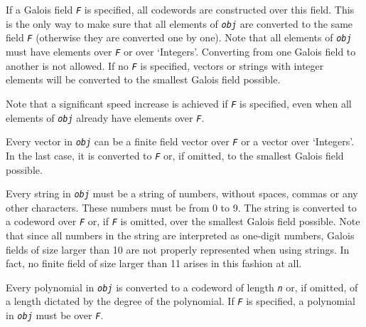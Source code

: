 \documentclass[a4paper,11pt]{report}
\begin{document}
{{{ If a Galois field \mbox{\texttt{\mdseries\slshape F}} is specified, all codewords are constructed over this field. This is the only
way to make sure that all elements of \mbox{\texttt{\mdseries\slshape obj}} are converted to the same field \mbox{\texttt{\mdseries\slshape F}} (otherwise they are converted one by one). Note that all elements of \mbox{\texttt{\mdseries\slshape obj}} must have elements over \mbox{\texttt{\mdseries\slshape F}} or over `Integers'. Converting from one Galois field to another is not
allowed. If no \mbox{\texttt{\mdseries\slshape F}} is specified, vectors or strings with integer elements will be converted to
the smallest Galois field possible. 

 Note that a significant speed increase is achieved if \mbox{\texttt{\mdseries\slshape F}} is specified, even when all elements of \mbox{\texttt{\mdseries\slshape obj}} already have elements over \mbox{\texttt{\mdseries\slshape F}}. 

 Every vector in \mbox{\texttt{\mdseries\slshape obj}} can be a finite field vector over \mbox{\texttt{\mdseries\slshape F}} or a vector over `Integers'. In the last case, it is converted to \mbox{\texttt{\mdseries\slshape F}} or, if omitted, to the smallest Galois field possible. 

 Every string in \mbox{\texttt{\mdseries\slshape obj}} must be a string of numbers, without spaces, commas or any other characters.
These numbers must be from 0 to 9. The string is converted to a codeword over \mbox{\texttt{\mdseries\slshape F}} or, if \mbox{\texttt{\mdseries\slshape F}} is omitted, over the smallest Galois field possible. Note that since all
numbers in the string are interpreted as one-digit numbers, Galois fields of
size larger than 10 are not properly represented when using strings. In fact,
no finite field of size larger than 11 arises in this fashion at all. 

 Every polynomial in \mbox{\texttt{\mdseries\slshape obj}} is converted to a codeword of length \mbox{\texttt{\mdseries\slshape n}} or, if omitted, of a length dictated by the degree of the polynomial. If \mbox{\texttt{\mdseries\slshape F}} is specified, a polynomial in \mbox{\texttt{\mdseries\slshape obj}} must be over \mbox{\texttt{\mdseries\slshape F}}. 

}}}
\end{document}
